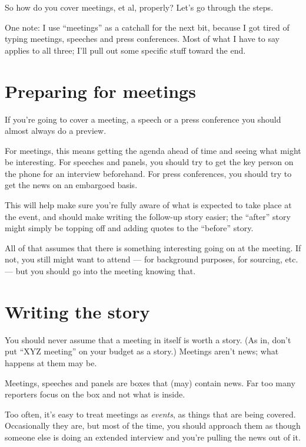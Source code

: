 \documentclass[
  11pt,
  american,
  letterpaperpaper,
  extrafontsizes,onecolumn,openright
  ]{memoir}
\begin{document}
So how do you cover meetings, et al, properly? Let's go through the steps.

One note: I use \enquote{meetings} as a catchall for the next bit, because I got tired of typing meetings, speeches and press conferences. Most of what I have to say applies to all three; I'll pull out some specific stuff toward the end.

\hypertarget{preparing-for-meetings}{%
\section*{Preparing for meetings}\label{preparing-for-meetings}}

If you're going to cover a meeting, a speech or a press conference you should almost always do a preview.

For meetings, this means getting the agenda ahead of time and seeing what might be interesting. For speeches and panels, you should try to get the key person on the phone for an interview beforehand. For press conferences, you should try to get the news on an embargoed basis.

This will help make sure you're fully aware of what is expected to take place at the event, and should make writing the follow-up story easier; the \enquote{after} story might simply be topping off and adding quotes to the \enquote{before} story.

All of that assumes that there is something interesting going on at the meeting. If not, you still might want to attend --- for background purposes, for sourcing, etc. --- but you should go into the meeting knowing that.

\hypertarget{writing-the-story}{%
\section*{Writing the story}\label{writing-the-story}}

You should never assume that a meeting in itself is worth a story. (As in, don't put \enquote{XYZ meeting} on your budget as a story.) Meetings aren't news; what happens at them may be.

Meetings, speeches and panels are boxes that (may) contain news. Far too many reporters focus on the box and not what is inside.

Too often, it's easy to treat meetings as \emph{events}, as things that are being covered. Occasionally they are, but most of the time, you should approach them as though someone else is doing an extended interview and you're pulling the news out of it.
\end{document}
